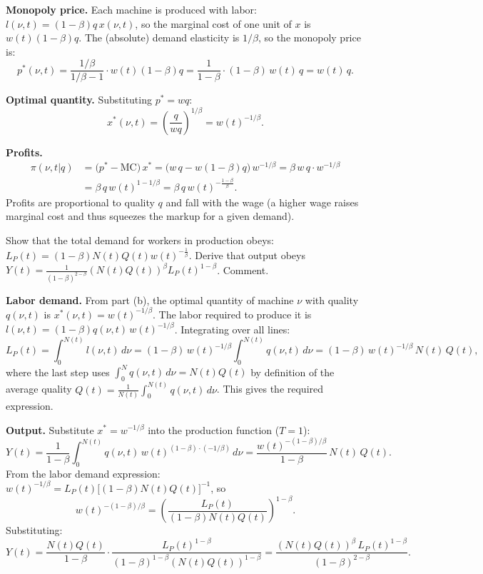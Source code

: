 \documentclass[11pt]{exam}
\begin{document}
\begin{questions}
\begin{solution}
\textbf{Monopoly price.}  Each machine is produced with labor: $l(\nu,t)=(1-\beta)q\,x(\nu,t)$, so the marginal cost of one unit of $x$ is $w(t)(1-\beta)q$.  The (absolute) demand elasticity is $1/\beta$, so the monopoly price is:
\[
	p^{*}(\nu,t) = \frac{1/\beta}{1/\beta - 1}\cdot w(t)(1-\beta)q = \frac{1}{1-\beta}\cdot(1-\beta)\,w(t)\,q = w(t)\,q.
\]

\textbf{Optimal quantity.}  Substituting $p^{*}=wq$:
\[
	x^{*}(\nu,t) = \left(\frac{q}{wq}\right)^{\!1/\beta} = w(t)^{-1/\beta}.
\]

\textbf{Profits.}
\begin{align*}
	\pi(\nu,t|q) &= \bigl(p^{*}-\text{MC}\bigr)\,x^{*}
	= \bigl(w\,q - w(1-\beta)q\bigr)\,w^{-1/\beta}
	= \beta\,w\,q\cdot w^{-1/\beta} \\[4pt]
	&= \beta\,q\,w(t)^{1-1/\beta} = \boxed{\beta\,q\,w(t)^{-\frac{1-\beta}{\beta}}.}
\end{align*}
Profits are proportional to quality $q$ and fall with the wage (a higher wage raises marginal cost and thus squeezes the markup for a given demand).
\end{solution}

\question Show that the total demand for workers in production obeys: $L_{P}(t)=(1-\beta)N(t)Q(t)w(t)^{-\frac{1}{\beta}}$. Derive that output obeys $Y(t)=\frac{1}{(1-\beta)^{2-\beta}}(N(t)Q(t))^{\beta}L_{P}(t)^{1-\beta}$. Comment.
\begin{solution}
\textbf{Labor demand.}  From part (b), the optimal quantity of machine $\nu$ with quality $q(\nu,t)$ is $x^{*}(\nu,t)=w(t)^{-1/\beta}$.  The labor required to produce it is $l(\nu,t)=(1-\beta)q(\nu,t)\,w(t)^{-1/\beta}$.  Integrating over all lines:
\[
	L_{P}(t)=\int_{0}^{N(t)}l(\nu,t)\,d\nu = (1-\beta)\,w(t)^{-1/\beta}\int_{0}^{N(t)}q(\nu,t)\,d\nu
	= (1-\beta)\,w(t)^{-1/\beta}\,N(t)\,Q(t),
\]
where the last step uses $\int_{0}^{N}q(\nu,t)\,d\nu=N(t)Q(t)$ by definition of the average quality $Q(t)=\frac{1}{N(t)}\int_{0}^{N(t)}q(\nu,t)\,d\nu$.  This gives the required expression.

\textbf{Output.}  Substitute $x^{*}=w^{-1/\beta}$ into the production function ($T=1$):
\[
	Y(t)=\frac{1}{1-\beta}\!\int_{0}^{N(t)}q(\nu,t)\,w(t)^{(1-\beta)\cdot(-1/\beta)}\,d\nu
	=\frac{w(t)^{-(1-\beta)/\beta}}{1-\beta}\,N(t)\,Q(t).
\]
From the labor demand expression: $w(t)^{-1/\beta}=L_{P}(t)\bigl[(1-\beta)N(t)Q(t)\bigr]^{-1}$, so
\[
	w(t)^{-(1-\beta)/\beta}=\left(\frac{L_{P}(t)}{(1-\beta)N(t)Q(t)}\right)^{\!1-\beta}.
\]
Substituting:
\[
	Y(t)=\frac{N(t)Q(t)}{1-\beta}\cdot\frac{L_{P}(t)^{1-\beta}}{(1-\beta)^{1-\beta}(N(t)Q(t))^{1-\beta}}
	= \boxed{\frac{(N(t)Q(t))^{\beta}\,L_{P}(t)^{1-\beta}}{(1-\beta)^{2-\beta}}.}
\]


\end{solution}
\end{questions}
\end{document}

